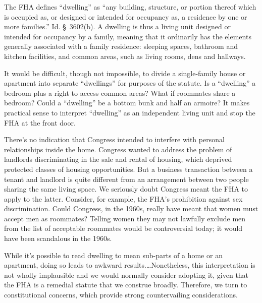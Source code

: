 The FHA defines ``dwelling'' as ``any building, structure, or portion thereof
which is occupied as, or designed or intended for occupancy as, a residence by
one or more families.'' Id. \S~3602(b). A dwelling is thus a living unit
designed or intended for occupancy by a family, meaning that it ordinarily has
the elements generally associated with a family residence: sleeping spaces,
bathroom and kitchen facilities, and common areas, such as living rooms, dens
and hallways.  

It would be difficult, though not impossible, to divide a single-family house or
apartment into separate ``dwellings'' for purposes of the statute. Is a
``dwelling'' a bedroom plus a right to access common areas? What if roommates
share a bedroom? Could a ``dwelling'' be a bottom bunk and half an armoire? It
makes practical sense to interpret ``dwelling'' as an independent living unit
and stop the FHA at the front door.

 There's no indication that Congress intended to interfere with personal
relationships inside the home. Congress wanted to address the problem of
landlords discriminating in the sale and rental of housing, which deprived
protected classes of housing opportunities. But a business transaction between
a tenant and landlord is quite different from an arrangement between two people
sharing the same living space. We seriously doubt Congress meant the FHA to
apply to the latter. Consider, for example, the FHA's prohibition against sex
discrimination. Could Congress, in the 1960s, really have meant that women must
accept men as roommates? Telling women they may not lawfully exclude men from
the list of acceptable roommates would be controversial today; it would have
been scandalous in the 1960s.

While it's possible to read dwelling to mean sub-parts of a home or an
apartment, doing so leads to awkward results.\ldots Nonetheless, this
interpretation is not wholly implausible and we would normally consider
adopting it, given that the FHA is a remedial statute that we construe broadly.
Therefore, we turn to constitutional concerns, which provide strong
countervailing considerations. 


